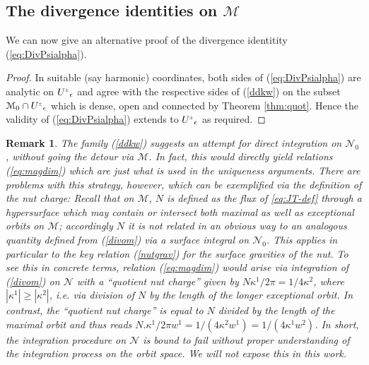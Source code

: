 \documentclass[a4paper,10pt,reqno]{amsart}
\newcommand{\cM}{\mathcal{M}}
\newcommand{\cN}{\mathcal{N}}
\theoremstyle{plain}
\newtheorem{remark}[thm]{Remark}
\newcommand{\PM}[1]{{{#1}^{\hspace{-.5pt}\scaleto{\pm}{3.5pt}}}}
\numberwithin{equation}{section}
\newcommand{\eps}{\epsilon}
\begin{document}
\subsection{The divergence identities on $\cM$}

We can now give an alternative proof of the divergence identitity 
%
(\ref{eq:DivPsialpha}).
%

\begin{proof} 
 In suitable (say harmonic) coordinates, both sides  
 of 
 (\ref{eq:DivPsialpha}) are analytic on  
 $\PM{U}_\eps$ and agree with the respective sides of (\ref{ddkw}) on the  subset $\cM_0 \cap \PM{U}_\eps$ which is dense, open and connected  by Theorem \ref{thm:quot}. Hence the validity of (\ref{eq:DivPsialpha})
extends to $\PM{U}_\eps$ as required.
\end{proof}

\begin{remark}
\label{quotint}
The family (\ref{ddkw})  suggests an attempt for direct integration on $\cN_0$, without going the detour via $\cM$. 
In fact, this would directly yield relations (\ref{eq:magdim}) which are just what is used in the uniqueness arguments. 
There are  problems with this strategy, however, which can be exemplified via the definition  of the  nut charge: Recall that on $\cM$, $N$ is defined  as the flux of \eqref{eq:JT-def} through a hypersurface which may contain or intersect both maximal as well as  exceptional orbits  on $\cM$; accordingly $N$ it is not related in an obvious way to an analogous  quantity  defined from (\ref{divom}) via  a surface integral on $\cN_0$. This applies  in particular to the key 
 relation (\ref{nutgrav})  for the surface gravities of the nut. To see this in concrete terms,   relation (\ref{eq:magdim}) would arise  via integration of (\ref{divom}) on $\cN$ with a ``quotient nut charge''  given by   $N \kappa^1 /2\pi  = 1/4 \kappa^2 $, where $|\kappa^1| \geq |\kappa^2|$, i.e. via division of $N$  by the length of the \emph{longer exceptional}   orbit. In contrast, the  ``quotient nut charge'' \cite[Eq. (5.9]{gibbons:hawking:1979} is equal to  $N$ divided by the length of the \emph{maximal} orbit and thus reads
 $N . \kappa^1 /2\pi w^1 = 1/(4 \kappa^2  w^1) =  1/(4 \kappa^1 w^2)  $. 
 In short, the integration  procedure on $\cN$ is bound to fail without proper understanding of the integration process on the orbit space.
 We will not expose this in this work.
 
\end{remark}





%
\newcommand{\arxivref}[1]{\href{http://www.arxiv.org/abs/#1}{{arXiv:#1}}}
\newcommand{\prd}{Phys. Rev. D} 


\end{document}
